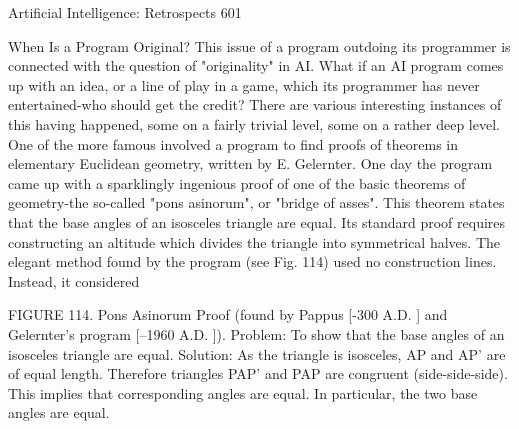 {Artificial Intelligence: Retrospects                                                        601

                         When Is a Program Original?
     This issue of a program outdoing its programmer is connected with the question of
"originality" in AI. What if an AI program comes up with an idea, or a line of play in a
game, which its programmer has never entertained-who should get the credit? There are
various interesting instances of this having happened, some on a fairly trivial level, some
on a rather deep level. One of the more famous involved a program to find proofs of
theorems in elementary Euclidean geometry, written by E. Gelernter. One day the
program came up with a sparklingly ingenious proof of one of the basic theorems of
geometry-the so-called "pons asinorum", or "bridge of asses".
     This theorem states that the base angles of an isosceles triangle are equal. Its
standard proof requires constructing an altitude which divides the triangle into
symmetrical halves. The elegant method found by the program (see Fig. 114) used no
construction lines. Instead, it considered

                                             FIGURE 114. Pons Asinorum Proof (found
                                             by Pappus [-300 A.D. ] and Gelernter's
                                             program [--1960 A.D. ]). Problem: To show
                                             that the base angles of an isosceles triangle
                                             are equal. Solution: As the triangle is
                                             isosceles, AP and AP' are of equal length.
                                             Therefore triangles PAP' and PAP are
                                             congruent (side-side-side). This implies that
                                             corresponding angles are equal. In
                                             particular, the two base angles are equal.


}
